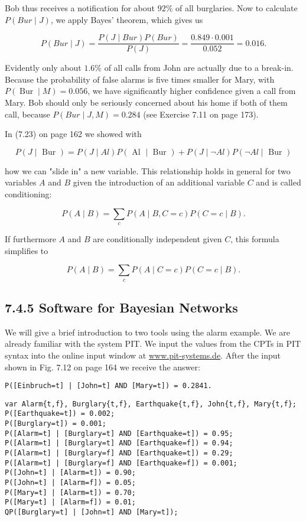 \documentclass[10pt]{article}
\begin{document}
Bob thus receives a notification for about $92 \%$ of all burglaries. Now to calculate $P(B u r \mid J)$, we apply Bayes' theorem, which gives us

$$
P(B u r \mid J)=\frac{P(J \mid B u r) P(B u r)}{P(J)}=\frac{0.849 \cdot 0.001}{0.052}=0.016 .
$$

Evidently only about $1.6 \%$ of all calls from John are actually due to a break-in. Because the probability of false alarms is five times smaller for Mary, with $P(\operatorname{Bur} \mid M)=0.056$, we have significantly higher confidence given a call from Mary. Bob should only be seriously concerned about his home if both of them call, because $P(B u r \mid J, M)=0.284$ (see Exercise 7.11 on page 173).

In (7.23) on page 162 we showed with

$$
P(J \mid \text { Bur })=P(J \mid A l) P(\text { Al } \mid \text { Bur })+P(J \mid \neg A l) P(\neg A l \mid \text { Bur })
$$

how we can "slide in" a new variable. This relationship holds in general for two variables $A$ and $B$ given the introduction of an additional variable $C$ and is called conditioning:

$$
P(A \mid B)=\sum_{c} P(A \mid B, C=c) P(C=c \mid B) .
$$

If furthermore $A$ and $B$ are conditionally independent given $C$, this formula simplifies to

$$
P(A \mid B)=\sum_{c} P(A \mid C=c) P(C=c \mid B) .
$$

\subsection*{7.4.5 Software for Bayesian Networks}
We will give a brief introduction to two tools using the alarm example. We are already familiar with the system PIT. We input the values from the CPTs in PIT syntax into the online input window at \href{http://www.pit-systems.de}{www.pit-systems.de}. After the input shown in Fig. 7.12 on page 164 we receive the answer:

\begin{verbatim}
P([Einbruch=t] | [John=t] AND [Mary=t]) = 0.2841.
\end{verbatim}

\begin{verbatim}
var Alarm{t,f}, Burglary{t,f}, Earthquake{t,f}, John{t,f}, Mary{t,f};
P([Earthquake=t]) = 0.002;
P([Burglary=t]) = 0.001;
P([Alarm=t] | [Burglary=t] AND [Earthquake=t]) = 0.95;
P([Alarm=t] | [Burglary=t] AND [Earthquake=f]) = 0.94;
P([Alarm=t] | [Burglary=f] AND [Earthquake=t]) = 0.29;
P([Alarm=t] | [Burglary=f] AND [Earthquake=f]) = 0.001;
P([John=t] | [Alarm=t]) = 0.90;
P([John=t] | [Alarm=f]) = 0.05;
P([Mary=t] | [Alarm=t]) = 0.70;
P([Mary=t] | [Alarm=f]) = 0.01;
QP([Burglary=t] | [John=t] AND [Mary=t]);
\end{verbatim}
\end{document}
